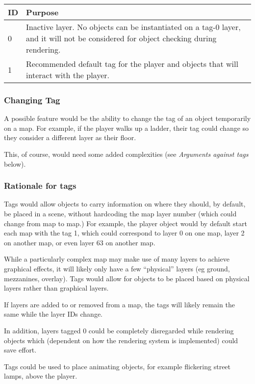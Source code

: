 \documentclass [12pt,a4paper]{article}
\begin{document}
\begin{tabular}{ l p{5in} }
  ID & Purpose \\
  \hline
  0  & Inactive layer.  No objects can be instantiated on a tag-0
       layer, and it will not be considered for object checking during 
       rendering. \\
  1  & Recommended default tag for the player and objects that will 
       interact with the player. \\
\end{tabular}

\subsubsection{Changing Tag}

A possible feature would be the ability to change the tag of an object
temporarily on a map.  For example, if the player walks up a ladder,
their tag could change so they consider a different layer as their
floor.

This, of course, would need some added complexities (see
\emph{Arguments against tags} below).

\subsubsection{Rationale for tags}

Tags would allow objects to carry information on where they should, by
default, be placed in a scene, without hardcoding the map layer number
(which could change from map to map.)  For example, the player object
would by default start each map with the tag 1, which could correspond
to layer 0 on one map, layer 2 on another map, or even layer 63 on
another map.

While a particularly complex map may make use of many layers to
achieve graphical effects, it will likely only have a few ``physical''
layers (eg ground, mezzanines, overlay).  Tags would allow for objects
to be placed based on physical layers rather than graphical layers.

If layers are added to or removed from a map, the tags will likely
remain the same while the layer IDs change.

In addition, layers tagged 0 could be completely disregarded while
rendering objects which (dependent on how the rendering system is
implemented) could save effort.

Tags could be used to place animating objects, for example flickering
street lamps, above the player.
\end{document}
